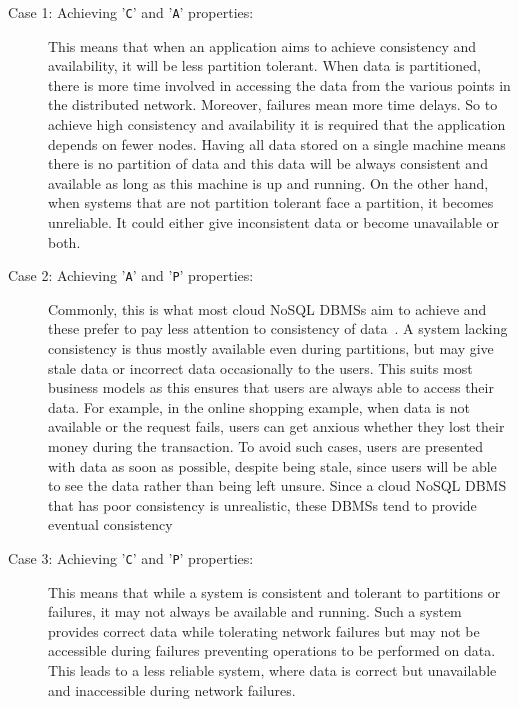 \begin{description}
	\item [Case 1: Achieving '\texttt{C}' and '\texttt{A}' properties:] This means
	that when an application aims to achieve consistency and availability, it will
	be less partition tolerant.
	When data is partitioned,   there is more time involved in accessing the data
	from the various points in the distributed network.  Moreover,   failures mean
	more time delays.  So to achieve high consistency and availability it is
	required that the application depends on fewer nodes.  Having all data stored on
	a single machine means there is no partition of data and this data will be
	always consistent and available as long as this machine is up and running.   On
	the other hand,   when systems that are not partition tolerant face a partition,
	it becomes unreliable.  It could either give inconsistent data or become
	unavailable or both.
		
	\item [Case 2: Achieving '\texttt{A}' and '\texttt{P}' properties:]
	Commonly,   this is what most cloud \ac{NoSQL} \acp{DBMS} aim to achieve and these
	prefer to pay less attention to consistency of data~\citep{Wada}.
	A system lacking consistency is thus mostly available even during partitions,   but
	may give stale data or incorrect data occasionally to the users.  This suits
	most business models as this ensures that users are always able to
	access their data.  For example,   in the  online shopping example,   when
	data is not available or the request fails,   users can get anxious whether
	they lost their money during the transaction.  To avoid such cases,   users
	are presented with data as soon as possible,   despite being stale,   since users
	will be able to see the data rather than being left unsure. 
	Since a cloud \ac{NoSQL} \ac{DBMS} that has poor consistency is unrealistic,  
	these \acp{DBMS} tend to provide eventual consistency
	
	\item [Case 3: Achieving '\texttt{C}' and '\texttt{P}' properties:] This means
	that while a system is consistent and tolerant to partitions or
	failures,   it may not always be available and running.  Such a system 
	provides correct data while tolerating network failures but may not be
	accessible during failures preventing operations to be performed on data.  This
	leads to a less reliable system,   where data is correct but unavailable and
	inaccessible during network failures.
	
	 
\end{description}

